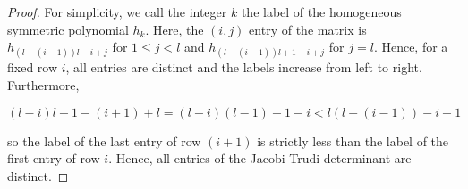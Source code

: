 \begin{proof}
For simplicity, we call the integer $k$ the label of the homogeneous symmetric polynomial $h_k$. Here, the $(i,j)$ entry of the matrix is $h_{(l-(i-1))l - i + j}$ for $1 \leq j < l$ and $h_{(l-(i-1))l + 1 - i + j}$ for $j = l$. Hence, for a fixed row $i$, all entries are distinct and the labels increase from left to right. Furthermore,

$$(l-i)l + 1 - (i+1) + l = (l-i)(l-1) + 1 - i < l(l-(i-1)) - i + 1$$

so the label of the last entry of row $(i+1)$ is strictly less than the label of the first entry of row $i$. Hence, all entries of the Jacobi-Trudi determinant are distinct.
\end{proof}

%
%

